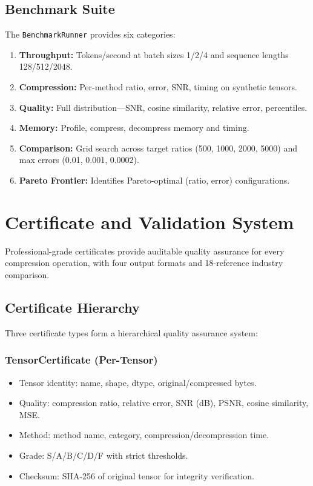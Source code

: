 \documentclass[11pt,a4paper,openright]{book}
\begin{document}
\section{Benchmark Suite}

The \texttt{BenchmarkRunner} provides six categories:

\begin{enumerate}
	\item \textbf{Throughput:} Tokens/second at batch sizes 1/2/4 and sequence lengths 128/512/2048.
	\item \textbf{Compression:} Per-method ratio, error, SNR, timing on synthetic tensors.
	\item \textbf{Quality:} Full distribution---SNR, cosine similarity, relative error, percentiles.
	\item \textbf{Memory:} Profile, compress, decompress memory and timing.
	\item \textbf{Comparison:} Grid search across target ratios (500, 1000, 2000, 5000) and max errors (0.01, 0.001, 0.0002).
	\item \textbf{Pareto Frontier:} Identifies Pareto-optimal (ratio, error) configurations.
\end{enumerate}

\chapter{Certificate and Validation System}
\label{ch:certificates}

Professional-grade certificates provide auditable quality assurance for every compression operation, with four output formats and 18-reference industry comparison.

\section{Certificate Hierarchy}

Three certificate types form a hierarchical quality assurance system:

\subsection{TensorCertificate (Per-Tensor)}

\begin{itemize}
	\item Tensor identity: name, shape, dtype, original/compressed bytes.
	\item Quality: compression ratio, relative error, SNR (dB), PSNR, cosine similarity, MSE.
	\item Method: method name, category, compression/decompression time.
	\item Grade: S/A/B/C/D/F with strict thresholds.
	\item Checksum: SHA-256 of original tensor for integrity verification.
\end{itemize}
\end{document}
